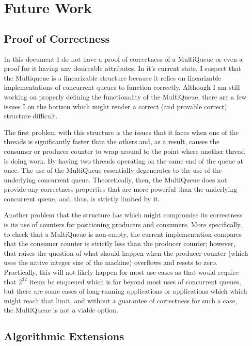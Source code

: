 \documentclass[12pt]{report}
\begin{document}
\begin{scriptsize}
\begin{algorithm}[H]
{}
\end{algorithm}
\end{scriptsize}

\section{Future Work}
\subsection{Proof of Correctness}
In this document I do not have a proof of correctness of a MultiQueue or even a
proof for it having any desireable attributes. In it's current state, I suspect
that the Multiqueue is a linearizable structure because it relies on
linearizable implementations of concurrent queues to function correctly.
Although I am still working on properly defining the functionality of the
MultiQueue, there are a few issues I on the horizon which might render a
correct (and provable correct) structure difficult.

The first problem with this structure is the issues that it faces when one of
the threads is significantly faster than the others and, as a result, causes
the consumer or producer counter to wrap around to the point where another
thread is doing work. By having two threads operating on the same end of the
queue at once. The use of the MultiQueue essentially degenerates to the use of
the underlying concurrent queue. Theoretically, then, the MultiQueue does not
provide any correctness properties that are more powerful than the underlying
concurrent queue, and, thus, is strictly limited by it.

Another problem that the structure has which might compromise its correctness
is its use of counters for positioning producers and consumers. More
specifically, to check that a MultiQueue is non-empty, the current
implementation compares that the consumer counter is strictly less than the
producer counter; however, that raises the question of what should happen when
the producer counter (which uses the native integer size of the machine)
overflows and resets to zero. Practically, this will not likely happen for most
use cases as that would require that $2^{32}$ items be enqueued which is far
beyond most uses of concurrent queues, but there are some cases of long-running
applications or applications which which might reach that limit, and without a
guarantee of correctness for such a case, the MultiQueue is not a viable
option.


\subsection{Algorithmic Extensions}
\end{document}
